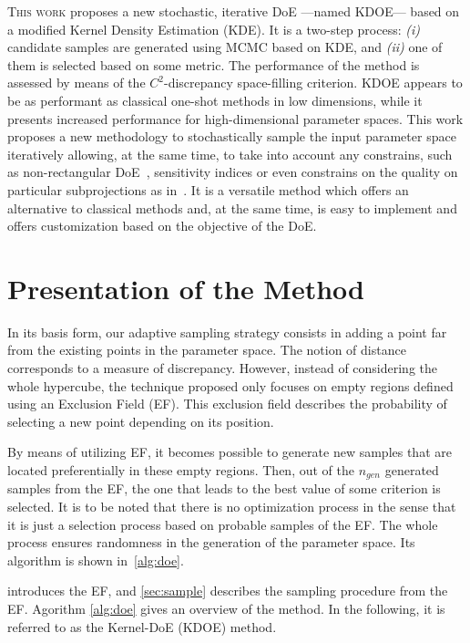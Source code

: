 \lettrine{T}{his work} proposes a new stochastic, iterative DoE ---\thinspace named KDOE\thinspace--- based on a modified Kernel Density Estimation (KDE). It is a two-step process: \emph{(i)} candidate samples are generated using MCMC based on KDE, and \emph{(ii)} one of them is selected based on some metric. The performance of the method is assessed by means of the $C^2$-discrepancy space-filling criterion. KDOE appears to be as performant as classical one-shot methods in low dimensions, while it presents increased performance for high-dimensional parameter spaces. This work proposes a new  methodology to stochastically sample the input parameter space iteratively allowing, at the same time, to take into account any constrains, such as non-rectangular DoE~\citep{Lekivetz2015}, sensitivity indices or even constrains on the quality on particular subprojections as in~\citep{Joseph2015}. It is a versatile method which offers an alternative to classical methods and, at the same time, is easy to implement and offers customization based on the objective of the DoE.

\section{Presentation of the Method}\label{sec:method}

In its basis form, our adaptive sampling strategy consists in adding a point far from the existing points in the parameter space. The notion of distance corresponds to a measure of discrepancy. However, instead of considering the whole hypercube, the technique proposed only focuses on empty regions defined using an Exclusion Field (EF). This exclusion field describes the probability of selecting a new point depending on its position.

By means of utilizing EF, it becomes possible to generate new samples that are located preferentially in these empty regions. Then, out of the $n_{gen}$ generated samples from the EF, the one that leads to the best value of some criterion is selected. It is to be noted that there is no optimization process in the sense that it is just a selection process based on probable samples of the EF. The whole process ensures randomness in the generation of the parameter space. Its algorithm is shown in~\cref{alg:doe}. %

 introduces the EF, and \cref{sec:sample} describes the sampling procedure from the EF. Agorithm \ref{alg:doe} gives an overview of the method. In the following, it is referred to as the Kernel-DoE (KDOE) method. 


